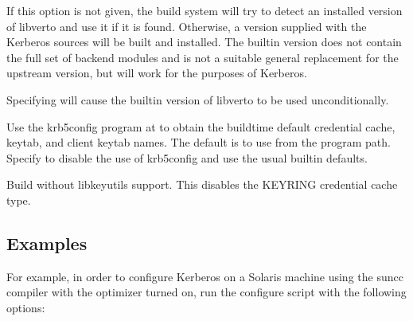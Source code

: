 \documentclass[letterpaper,10pt,english]{sphinxmanual}
\begin{document}
\begin{description}
\sphinxAtStartPar
If this option is not given, the build system will try to detect
an installed version of libverto and use it if it is found.
Otherwise, a version supplied with the Kerberos sources will be
built and installed.  The built\sphinxhyphen{}in version does not contain the
full set of back\sphinxhyphen{}end modules and is not a suitable general
replacement for the upstream version, but will work for the
purposes of Kerberos.

\sphinxAtStartPar
Specifying \sphinxstylestrong{\sphinxhyphen{}} will cause the built\sphinxhyphen{}in
version of libverto to be used unconditionally.

\sphinxAtStartPar
Use the krb5\sphinxhyphen{}config program at  to obtain the build\sphinxhyphen{}time
default credential cache, keytab, and client keytab names.  The
default is to use  from the program path.  Specify
 to disable the use of krb5\sphinxhyphen{}config and
use the usual built\sphinxhyphen{}in defaults.

\sphinxAtStartPar
Build without libkeyutils support.  This disables the KEYRING
credential cache type.

\end{description}


\subsection{Examples}
\label{\detokenize{build/options2configure:examples}}
\sphinxAtStartPar
For example, in order to configure Kerberos on a Solaris machine using
the suncc compiler with the optimizer turned on, run the configure
script with the following options:

\begin{sphinxVerbatim}[commandchars=\\\{\}]
   
\end{sphinxVerbatim}
\end{document}
